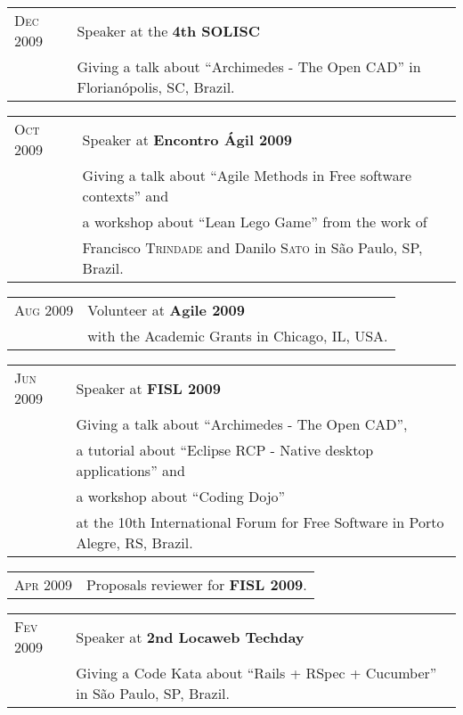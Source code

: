 \documentclass[letter,10pt]{article}
\begin{document}
\begin{tabular}{p{2.5cm}l}
  \textsc{Dec 2009} & Speaker at the \textbf{4th SOLISC}\\
  &Giving a talk about ``Archimedes - The Open CAD'' in Florianópolis, SC, Brazil.\\
\end{tabular}

\begin{tabular}{p{2.5cm}l}
  \textsc{Oct 2009} & Speaker at \textbf{Encontro Ágil 2009}\\
  &Giving a talk about ``Agile Methods in Free software contexts'' and\\
  &a workshop about ``Lean Lego Game'' from the work of\\
  &Francisco \textsc{Trindade} and Danilo \textsc{Sato} in São Paulo, SP, Brazil.\\
\end{tabular}

\begin{tabular}{p{2.5cm}l}
  \textsc{Aug 2009} & Volunteer at \textbf{Agile 2009}\\
  & with the Academic Grants in Chicago, IL, USA.\\
\end{tabular}

\begin{tabular}{p{2.5cm}l}
  \textsc{Jun 2009} & Speaker at \textbf{FISL 2009}\\
  &Giving a talk about ``Archimedes - The Open CAD'',\\
  & a tutorial about ``Eclipse RCP - Native desktop applications'' and\\
  & a workshop about ``Coding Dojo''\\
  & at the 10th International Forum for Free Software in Porto
  Alegre, RS, Brazil.
\end{tabular}

\begin{tabular}{p{2.5cm}l}
  \textsc{Apr 2009} & Proposals reviewer for \textbf{FISL 2009}.\\
\end{tabular}

\begin{tabular}{p{2.5cm}l}
  \textsc{Fev 2009} & Speaker at \textbf{2nd Locaweb Techday}\\
  & Giving a Code Kata about ``Rails + RSpec + Cucumber'' in São Paulo, SP, Brazil.\\
\end{tabular}
\end{document}
